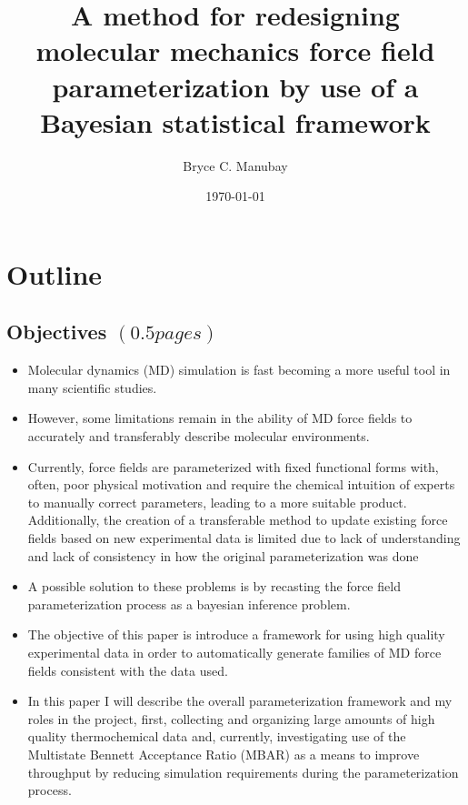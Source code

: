 \documentclass[aps,pre,onecolumn,nofootinbib,superscriptaddress,linenumbers,12pt,draft,tightenlines,notitlepage]{revtex4-1}
\begin{document}


\title{A method for redesigning molecular mechanics force field parameterization by use of a Bayesian statistical framework}

\author{Bryce C. Manubay} 

\date{\today}

\maketitle
\section{Outline}
\subsection{Objectives $\left(0.5 pages\right)$}
\begin{itemize}
 \item Molecular dynamics (MD) simulation is fast becoming a more useful tool in many scientific studies.
 \item However, some limitations remain in the ability of MD force fields to accurately and transferably describe molecular environments.
 \item Currently, force fields are parameterized with fixed functional forms with, often, poor physical motivation and require the chemical intuition of experts to manually correct parameters, leading to a more suitable product. Additionally, the creation of a transferable method to update existing force fields based on new experimental data is limited due to lack of understanding and lack of consistency in how the original parameterization was done 
 \item A possible solution to these problems is by recasting the force field parameterization process as a bayesian inference problem.
 \item The objective of this paper is introduce a framework for using high quality experimental data in order to automatically generate families of MD force fields consistent with the data used.
 \item In this paper I will describe the overall parameterization framework and my roles in the project, first, collecting and organizing large amounts of high quality thermochemical data and, currently, investigating use of the Multistate Bennett Acceptance Ratio (MBAR) as a means to improve throughput by reducing simulation requirements during the parameterization process.      
\end{itemize}
\end{document}
